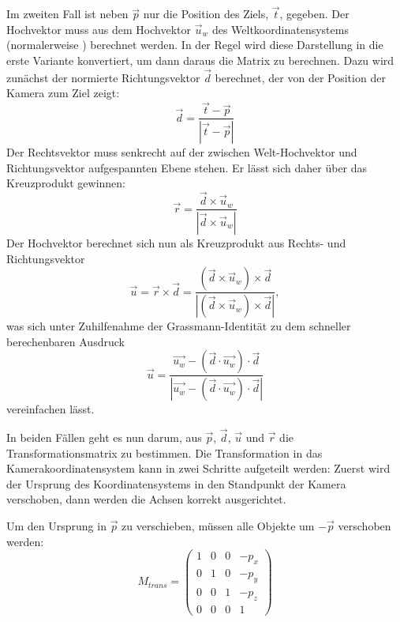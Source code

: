 Im zweiten Fall ist neben $\vec p$ nur die Position des Ziels, $\vec t$, gegeben. Der Hochvektor muss aus dem Hochvektor $\vec u_w$ des Weltkoordinatensystems (normalerweise ) berechnet werden. In der Regel wird diese Darstellung in die erste Variante konvertiert, um dann daraus die Matrix zu berechnen. Dazu wird zunächst der normierte Richtungsvektor $\vec d$ berechnet, der von der Position der Kamera zum Ziel zeigt:
\begin{equation}
 \vec d = \frac{\vec t - \vec p}{\left| \vec t - \vec p \right|}
\end{equation}
Der Rechtsvektor muss senkrecht auf der zwischen Welt-Hochvektor und Richtungsvektor aufgespannten Ebene stehen. Er lässt sich daher über das Kreuzprodukt gewinnen:
\begin{equation}
 \vec r = \frac{\vec d \times \vec u_w}{\left| \vec d \times \vec u_w \right|}
\end{equation} 
Der Hochvektor berechnet sich nun als Kreuzprodukt aus Rechts- und Richtungsvektor
\begin{equation}
 \vec u = \vec r \times \vec d = \frac{\left( \vec d \times \vec u_w \right) \times \vec d}{\left| \left( \vec d \times \vec u_w \right) \times \vec d \right|},
\end{equation} 
was sich unter Zuhilfenahme der Grassmann-Identität zu dem schneller berechenbaren Ausdruck
\begin{equation}
 \vec u = \frac{ \vec{u_w} - \left( \vec{d} \cdot \vec{u_w} \right) \cdot \vec{d} }{\left| \vec{u_w} - \left( \vec{d} \cdot \vec{u_w} \right) \cdot \vec{d} \right|}
\end{equation} 
vereinfachen lässt.

In beiden Fällen geht es nun darum, aus $\vec p$, $\vec d$, $\vec u$ und $\vec r$ die Transformationsmatrix zu bestimmen. Die Transformation in das Kamerakoordinatensystem kann in zwei Schritte aufgeteilt werden: Zuerst wird der Ursprung des Koordinatensystems in den Standpunkt der Kamera verschoben, dann werden die Achsen korrekt ausgerichtet.

Um den Ursprung in $\vec p$ zu verschieben, müssen alle Objekte um $-\vec p$ verschoben werden:
\begin{equation}
 M_{trans} = \begin{pmatrix}
  1 & 0 & 0 & -p_x \\
  0 & 1 & 0 & -p_y \\
  0 & 0 & 1 & -p_z \\
  0 & 0 & 0 & 1
 \end{pmatrix}
\end{equation}

